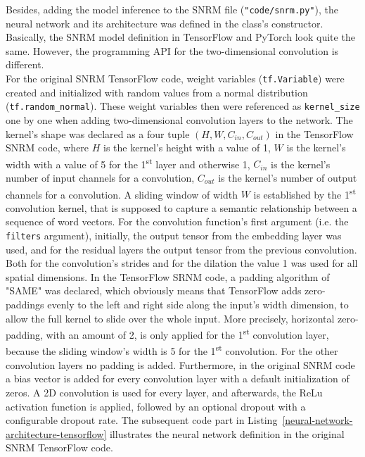 Besides, adding the model inference to the SNRM file (\texttt{"code/snrm.py"}),
    the neural network and its architecture was defined in the class's constructor.
Basically, the SNRM model definition in TensorFlow and PyTorch look quite the same.
However, the programming API for the two-dimensional convolution is different.\\
For the original SNRM TensorFlow code, weight variables (\texttt{tf.Variable}) were created and
    initialized with random values from a normal distribution (\texttt{tf.random\_normal}).
These weight variables then were referenced as \texttt{kernel\_size} one by one when adding 
    two-dimensional convolution layers to the network.
The kernel's shape was declared as a four tuple $(H, W, C_{in}, C_{out})$ in the TensorFlow 
    SNRM code, where 
    $H$ is the kernel's height with a value of 1,
    $W$ is the kernel's width with a value of 5 for the 1\textsuperscript{st} layer and otherwise 1,
    $C_{in}$ is the kernel's number of input channels for a convolution,
    $C_{out}$ is the kernel's number of output channels for a convolution.
A sliding window of width $W$ is established by the 1\textsuperscript{st} convolution kernel, 
    that is supposed to capture a semantic relationship between a sequence of word vectors.
For the convolution function's first argument (i.e. the \texttt{filters} argument),
    initially, the output tensor from the embedding layer was used, and
    for the residual layers the output tensor from the previous convolution.
Both for the convolution's strides and for the dilation the value 1 was used for all spatial dimensions.
In the TensorFlow SRNM code, a padding algorithm of "SAME" was declared, which obviously means
    that TensorFlow adds zero-paddings evenly to the left and right side along the input's width dimension,
    to allow the full kernel to slide over the whole input.
More precisely, horizontal zero-padding, with an amount of 2, is only applied for 
    the 1\textsuperscript{st} convolution layer,
    because the sliding window's width is 5 for the 1\textsuperscript{st} convolution.
For the other convolution layers no padding is added.
Furthermore, in the original SNRM code a bias vector is added for every convolution layer with a default 
    initialization of zeros.
A 2D convolution is used for every layer, and afterwards, the ReLu activation function is applied,
    followed by an optional dropout with a configurable dropout rate.
The subsequent code part in Listing~\ref{neural-network-architecture-tensorflow} illustrates the 
    neural network definition in the original SNRM TensorFlow code.

